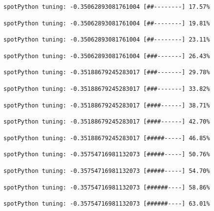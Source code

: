 \documentclass[
  letterpaper,
  DIV=11,
  numbers=noendperiod]{scrreprt}
\begin{document}
\begin{verbatim}
spotPython tuning: -0.35062893081761004 [##--------] 17.57% 
\end{verbatim}

\begin{verbatim}
spotPython tuning: -0.35062893081761004 [##--------] 19.81% 
\end{verbatim}

\begin{verbatim}
spotPython tuning: -0.35062893081761004 [##--------] 23.11% 
\end{verbatim}

\begin{verbatim}
spotPython tuning: -0.35062893081761004 [###-------] 26.43% 
\end{verbatim}

\begin{verbatim}
spotPython tuning: -0.35188679245283017 [###-------] 29.78% 
\end{verbatim}

\begin{verbatim}
spotPython tuning: -0.35188679245283017 [###-------] 33.82% 
\end{verbatim}

\begin{verbatim}
spotPython tuning: -0.35188679245283017 [####------] 38.71% 
\end{verbatim}

\begin{verbatim}
spotPython tuning: -0.35188679245283017 [####------] 42.70% 
\end{verbatim}

\begin{verbatim}
spotPython tuning: -0.35188679245283017 [#####-----] 46.85% 
\end{verbatim}

\begin{verbatim}
spotPython tuning: -0.35754716981132073 [#####-----] 50.76% 
\end{verbatim}

\begin{verbatim}
spotPython tuning: -0.35754716981132073 [#####-----] 54.70% 
\end{verbatim}

\begin{verbatim}
spotPython tuning: -0.35754716981132073 [######----] 58.86% 
\end{verbatim}

\begin{verbatim}
spotPython tuning: -0.35754716981132073 [######----] 63.01% 
\end{verbatim}
\end{document}
